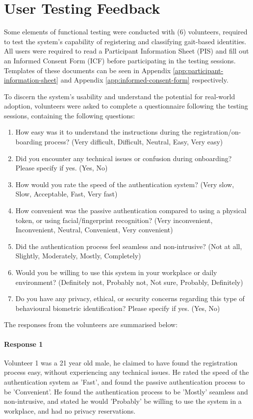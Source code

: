 \section{User Testing Feedback}
\label{sec:user-testing}

Some elements of functional testing were conducted with (6) volunteers, required to test the system's capability of registering and classifying gait-based identities.
All users were required to read a Participant Information Sheet (PIS) and fill out an Informed Consent Form (ICF) before participating in the testing sessions.
Templates of these documents can be seen in Appendix \ref{app:participant-information-sheet} and Appendix \ref{app:informed-consent-form} respectively.

To discern the system's usability and understand the potential for real-world adoption, volunteers were asked to complete a questionnaire following the testing sessions, containing the following questions:

\begin{enumerate}
	\item How easy was it to understand the instructions during the registration/on-boarding process? (Very difficult, Difficult, Neutral, Easy, Very easy)
	\item Did you encounter any technical issues or confusion during onboarding? Please specify if yes. (Yes, No)
	\item How would you rate the speed of the authentication system? (Very slow, Slow, Acceptable, Fast, Very fast)
	\item How convenient was the passive authentication compared to using a physical token, or using facial/fingerprint recognition? (Very inconvenient, Inconvenient, Neutral, Convenient, Very convenient)
	\item Did the authentication process feel seamless and non-intrusive? (Not at all, Slightly, Moderately, Mostly, Completely)
	\item Would you be willing to use this system in your workplace or daily environment? (Definitely not, Probably not, Not sure, Probably, Definitely)
	\item Do you have any privacy, ethical, or security concerns regarding this type of behavioural biometric identification? Please specify if yes. (Yes, No)
\end{enumerate}

The responses from the volunteers are summarised below:

\paragraph{Response 1} Volunteer 1 was a 21 year old male, he claimed to have found the registration process easy, without experiencing any technical issues.
He rated the speed of the authentication system as 'Fast', and found the passive authentication process to be 'Convenient'.
He found the authentication process to be 'Mostly' seamless and non-intrusive, and stated he would 'Probably' be willing to use the system in a workplace, and had no privacy reservations.

